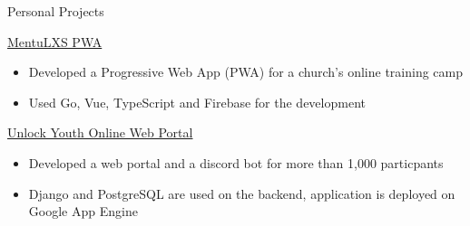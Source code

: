 \documentclass{article}
\newlength{\tabin}
\newlength{\secsep}
\newcommand{\lineunder}{\vspace*{-8pt} \\ \hspace*{-6pt} \hrulefill \\ \vspace*{-15pt}}
\newenvironment{tabbedsection}[1]{
  \begin{list}{}{
      \setlength{\itemsep}{0pt}
      \setlength{\labelsep}{0pt}
      \setlength{\labelwidth}{0pt}
      \setlength{\leftmargin}{\tabin}
      \setlength{\rightmargin}{\tabin}
      \setlength{\listparindent}{0pt}
      \setlength{\parsep}{0pt}
      \setlength{\parskip}{0pt}
      \setlength{\partopsep}{0pt}
      \setlength{\topsep}{#1}
    }
  \item[]
}{\end{list}}
\newenvironment{resume_section}[1]{
  \filbreak
  \vspace{2\secsep}
  \textsc{\large#1}
  \lineunder
  \begin{tabbedsection}{\secsep}
}{\end{tabbedsection}}
\newenvironment{resume_subsection}[2][]{
  \textbf{#2} \hfill {\footnotesize #1} \hspace{2em}
  \begin{tabbedsection}{0.5\secsep}
}{\end{tabbedsection}}
\newenvironment{subitems}{
  \renewcommand{\labelitemi}{-}
  \begin{itemize}
      \setlength{\labelsep}{1em}
}{\end{itemize}}
\begin{document}
\begin{resume_section}{Personal Projects}
  \begin{resume_subsection}[(August 2021)]{\href{https://github.com/marcustut/mentu-lxs}{MentuLXS PWA}}
    \begin{subitems}
      \item Developed a Progressive Web App (PWA) for a church's online training camp
      \item Used Go, Vue, TypeScript and Firebase for the development
    \end{subitems}
  \end{resume_subsection}

  \begin{resume_subsection}{\href{https://github.com/marcustut/UnlockProject}{Unlock Youth Online Web Portal}}
    \begin{subitems}
      \item Developed a web portal and a discord bot for more than 1,000 particpants
      \item Django and PostgreSQL are used on the backend, application is deployed on Google App Engine
    \end{subitems}
  \end{resume_subsection}
\end{resume_section}
\end{document}
